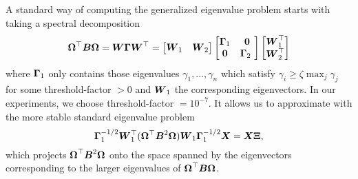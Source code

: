 A standard way of computing the generalized eigenvalue problem 
starts with taking a spectral decomposition
\begin{equation}
    \boldsymbol{\Omega}^{\top} \boldsymbol{B} \boldsymbol{\Omega}
    = \boldsymbol{W} \boldsymbol{\Gamma} \boldsymbol{W}^{\top}
    = \begin{bmatrix} \boldsymbol{W}_1 & \boldsymbol{W}_2 \end{bmatrix} 
    \begin{bmatrix} \boldsymbol{\Gamma}_1 & \boldsymbol{0} \\ \boldsymbol{0} & \boldsymbol{\Gamma}_2 \ \end{bmatrix} 
    \begin{bmatrix} \boldsymbol{W}_1^{\top} \\ \boldsymbol{W}_2^{\top} \end{bmatrix}
\end{equation}
where $\boldsymbol{\Gamma}_1$ only contains those eigenvalues $\gamma_1, \dots, \gamma_n$
which satisfy $\gamma_i \geq \zeta \max_{j} \gamma_j$ 
for some \gls{threshold-factor} $>0$ and $\boldsymbol{W}_1$ the corresponding
eigenvectors. In our experiments, we choose \gls{threshold-factor} $=10^{-7}$.
It allows us to approximate 
with the more stable standard eigenvalue problem
\begin{equation}
    \boldsymbol{\Gamma}_1^{-1/2} \boldsymbol{W}_1^{\top} (\boldsymbol{\Omega}^{\top} \boldsymbol{B}^2 \boldsymbol{\Omega}) \boldsymbol{W}_1 \boldsymbol{\Gamma}_1^{-1/2} \boldsymbol{X} = \boldsymbol{X} \boldsymbol{\Xi},
    \label{equ:3-nystrom-converted-generalized-eigenvalue-problem}
\end{equation}
which projects $\boldsymbol{\Omega}^{\top} \boldsymbol{B}^2 \boldsymbol{\Omega}$ onto the space spanned
by the eigenvectors corresponding to the larger eigenvalues of
$\boldsymbol{\Omega}^{\top} \boldsymbol{B} \boldsymbol{\Omega}$.\\

